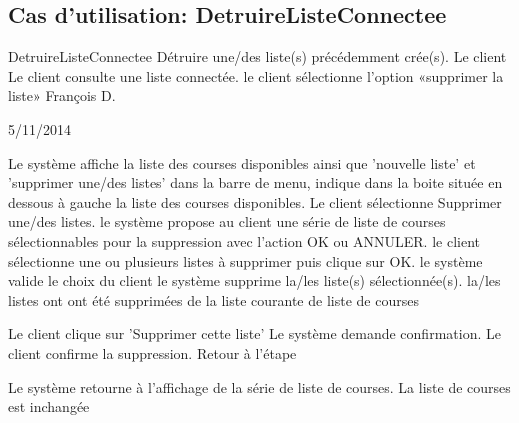 \subsection{Cas d'utilisation: DetruireListeConnectee}

\startCU
\nom DetruireListeConnectee
\but Détruire une/des liste(s) précédemment crée(s).
\acteur Le client
\precondition Le client consulte une liste connectée.
\declenchement le client sélectionne l'option «supprimer la liste»
\auteur François D.
\date 05/11/2014

\nominal %
\startnominal
\etape[DEBUT] Le système affiche la liste des courses disponibles ainsi que 'nouvelle liste' et 'supprimer une/des listes' dans la barre de menu, indique dans la boite située en dessous à gauche la liste des courses disponibles.
\etape[DEJALISTE] Le client sélectionne Supprimer une/des listes.
\etape le système propose au client une série de liste de courses sélectionnables pour la suppression avec l'action OK ou ANNULER.
\etape[ANNULATION] le client sélectionne une ou plusieurs listes à supprimer puis clique sur OK.
\etape[VALIDATION] le système valide le choix du client
\etape[AFFICHAGE] le système supprime la/les liste(s) sélectionnée(s).
\stopnominal
\postcondition la/les listes ont ont été supprimées de la liste courante de liste de courses

\alternatifs 
\startalternatif[DEJALISTE] 
  \etape Le client clique sur 'Supprimer cette liste'
  \etape Le système demande confirmation.
  \etape Le client confirme la suppression.
  \etape Retour à l'étape \in[VALIDATION]
\stopcondition
\stopalternatif

\exception 
\startalternatif[ANNULATION] 
  \etape Le système retourne à l'affichage de la série de liste de courses.
\stopcondition
\postcondition La liste de courses est inchangée
\stopalternatif
\stopCU
